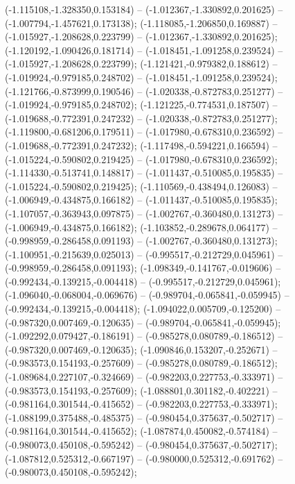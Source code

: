  (-1.115108,-1.328350,0.153184) -- (-1.012367,-1.330892,0.201625) -- (-1.007794,-1.457621,0.173138);
 (-1.118085,-1.206850,0.169887) -- (-1.015927,-1.208628,0.223799) -- (-1.012367,-1.330892,0.201625);
 (-1.120192,-1.090426,0.181714) -- (-1.018451,-1.091258,0.239524) -- (-1.015927,-1.208628,0.223799);
 (-1.121421,-0.979382,0.188612) -- (-1.019924,-0.979185,0.248702) -- (-1.018451,-1.091258,0.239524);
 (-1.121766,-0.873999,0.190546) -- (-1.020338,-0.872783,0.251277) -- (-1.019924,-0.979185,0.248702);
 (-1.121225,-0.774531,0.187507) -- (-1.019688,-0.772391,0.247232) -- (-1.020338,-0.872783,0.251277);
 (-1.119800,-0.681206,0.179511) -- (-1.017980,-0.678310,0.236592) -- (-1.019688,-0.772391,0.247232);
 (-1.117498,-0.594221,0.166594) -- (-1.015224,-0.590802,0.219425) -- (-1.017980,-0.678310,0.236592);
 (-1.114330,-0.513741,0.148817) -- (-1.011437,-0.510085,0.195835) -- (-1.015224,-0.590802,0.219425);
 (-1.110569,-0.438494,0.126083) -- (-1.006949,-0.434875,0.166182) -- (-1.011437,-0.510085,0.195835);
 (-1.107057,-0.363943,0.097875) -- (-1.002767,-0.360480,0.131273) -- (-1.006949,-0.434875,0.166182);
 (-1.103852,-0.289678,0.064177) -- (-0.998959,-0.286458,0.091193) -- (-1.002767,-0.360480,0.131273);
 (-1.100951,-0.215639,0.025013) -- (-0.995517,-0.212729,0.045961) -- (-0.998959,-0.286458,0.091193);
 (-1.098349,-0.141767,-0.019606) -- (-0.992434,-0.139215,-0.004418) -- (-0.995517,-0.212729,0.045961);
 (-1.096040,-0.068004,-0.069676) -- (-0.989704,-0.065841,-0.059945) -- (-0.992434,-0.139215,-0.004418);
 (-1.094022,0.005709,-0.125200) -- (-0.987320,0.007469,-0.120635) -- (-0.989704,-0.065841,-0.059945);
 (-1.092292,0.079427,-0.186191) -- (-0.985278,0.080789,-0.186512) -- (-0.987320,0.007469,-0.120635);
 (-1.090846,0.153207,-0.252671) -- (-0.983573,0.154193,-0.257609) -- (-0.985278,0.080789,-0.186512);
 (-1.089684,0.227107,-0.324669) -- (-0.982203,0.227753,-0.333971) -- (-0.983573,0.154193,-0.257609);
 (-1.088801,0.301182,-0.402221) -- (-0.981164,0.301544,-0.415652) -- (-0.982203,0.227753,-0.333971);
 (-1.088199,0.375488,-0.485375) -- (-0.980454,0.375637,-0.502717) -- (-0.981164,0.301544,-0.415652);
 (-1.087874,0.450082,-0.574184) -- (-0.980073,0.450108,-0.595242) -- (-0.980454,0.375637,-0.502717);
 (-1.087812,0.525312,-0.667197) -- (-0.980000,0.525312,-0.691762) -- (-0.980073,0.450108,-0.595242);
